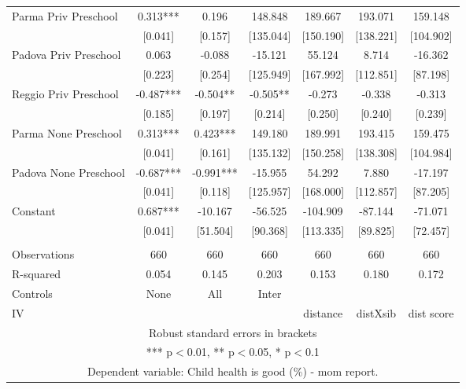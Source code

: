 \begin{tabular}{lcccccc}
Parma Priv Preschool & 0.313*** & 0.196 & 148.848 & 189.667 & 193.071 & 159.148 \\
 & [0.041] & [0.157] & [135.044] & [150.190] & [138.221] & [104.902] \\
Padova Priv Preschool & 0.063 & -0.088 & -15.121 & 55.124 & 8.714 & -16.362 \\
 & [0.223] & [0.254] & [125.949] & [167.992] & [112.851] & [87.198] \\
Reggio Priv Preschool & -0.487*** & -0.504** & -0.505** & -0.273 & -0.338 & -0.313 \\
 & [0.185] & [0.197] & [0.214] & [0.250] & [0.240] & [0.239] \\
Parma None Preschool & 0.313*** & 0.423*** & 149.180 & 189.991 & 193.415 & 159.475 \\
 & [0.041] & [0.161] & [135.132] & [150.258] & [138.308] & [104.984] \\
Padova None Preschool & -0.687*** & -0.991*** & -15.955 & 54.292 & 7.880 & -17.197 \\
 & [0.041] & [0.118] & [125.957] & [168.000] & [112.857] & [87.205] \\
Constant & 0.687*** & -10.167 & -56.525 & -104.909 & -87.144 & -71.071 \\
 & [0.041] & [51.504] & [90.368] & [113.335] & [89.825] & [72.457] \\
 &  &  &  &  &  &  \\
Observations & 660 & 660 & 660 & 660 & 660 & 660 \\
R-squared & 0.054 & 0.145 & 0.203 & 0.153 & 0.180 & 0.172 \\
Controls & None & All & Inter &  &  &  \\
 IV &  &  &  & distance & distXsib & dist score \\ \hline
\multicolumn{7}{c}{ Robust standard errors in brackets} \\
\multicolumn{7}{c}{ *** p$<$0.01, ** p$<$0.05, * p$<$0.1} \\
\multicolumn{7}{c}{ Dependent variable: Child health is good (\%) - mom report.} \\
\end{tabular}
